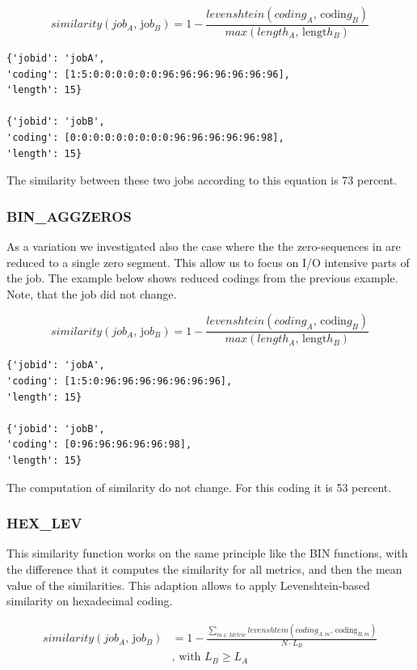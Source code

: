\documentclass[]{llncs}
\begin{document}
\begin{equation}
similarity \left( job_{A}\text{, jo}b_{B} \right) =1- \frac{levenshtein \left( coding_{A}\text{, codin}g_{B} \right) }{max \left( length_{A}\text{, lengt}h_{B} \right) }
\end{equation}

\begin{lstlisting}
{'jobid': 'jobA',
'coding': [1:5:0:0:0:0:0:0:96:96:96:96:96:96:96],
'length': 15} 

{'jobid': 'jobB',
'coding': [0:0:0:0:0:0:0:0:0:96:96:96:96:96:98],
'length': 15}
\end{lstlisting}

The similarity between these two jobs according to this equation is 73 percent.

\subsubsection{BIN\_AGGZEROS}
As a variation we investigated also the case where the the zero-sequences in are reduced to a single zero segment. This allow us to focus on I/O intensive parts of the job. The example below shows reduced codings from the previous example. Note, that the job did not change.

\begin{equation}
similarity \left( job_{A}\text{, jo}b_{B} \right) =1- \frac{levenshtein \left( coding_{A}\text{, codin}g_{B} \right) }{max \left( length_{A}\text{, lengt}h_{B} \right) }
\end{equation}

\begin{lstlisting}
{'jobid': 'jobA',
'coding': [1:5:0:96:96:96:96:96:96:96],
'length': 15}

{'jobid': 'jobB',
'coding': [0:96:96:96:96:96:98],
'length': 15}
\end{lstlisting}

The computation of similarity do not change.
For this coding it is 53 percent.


\subsubsection{HEX\_LEV}
This similarity function works on the same principle like the BIN functions, with the difference that it computes the similarity for all metrics, and then the mean value of the similarities.
This adaption allows to apply Levenshtein-based similarity on hexadecimal coding.

\begin{align}
  similarity \left( job_{A}\text{, jo}b_{B} \right) &= 1 -\frac{ \sum_{m \in Metric}^{} levenshtein \left( coding_{A,m}\text{, coding}_{B,m} \right) }{N \cdot L_{B}} \\
	&\text{, with }L_{B} \geq L_{A}
\end{align}
\end{document}
